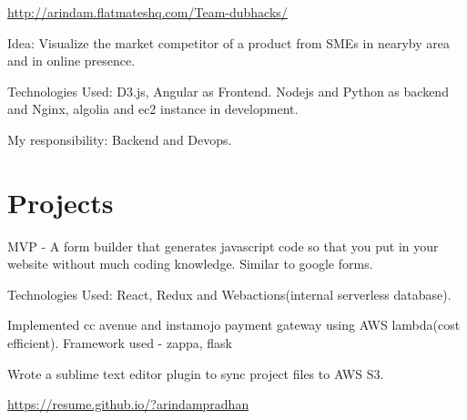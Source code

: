 \documentclass[]{deedy-resume-openfont}
\begin{document}
\begin{minipage}[t]{0.66\textwidth}
{ \url{http://arindam.flatmateshq.com/Team-dubhacks/} }\\
\begin{tightemize}
\item Idea: Visualize the market competitor of a product from SMEs in nearyby area and in online presence.
\item Technologies Used: D3.js, Angular as Frontend. Nodejs and Python as backend and Nginx, algolia and ec2 instance in development.
\item My responsibility: Backend and Devops.
\vspace{\topsep} %
\end{tightemize}

\section{Projects}


\begin{tightemize}
\item MVP - A form builder that generates javascript code so that you put in your website without much coding knowledge. Similar to google forms.
\item Technologies Used: React, Redux and Webactions(internal serverless database).
\vspace{\topsep} %
\end{tightemize}

\begin{tightemize}
\item Implemented cc avenue and instamojo payment gateway using AWS lambda(cost efficient). Framework used - zappa, flask
\item Wrote a sublime text editor plugin to sync project files to AWS S3.
\vspace{\topsep} %
\end{tightemize}

{ \url{https://resume.github.io/?arindampradhan } }\\


\end{minipage}
\end{document}
